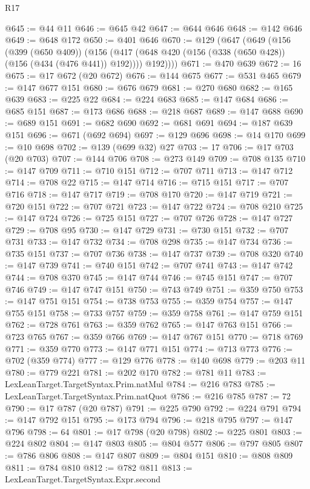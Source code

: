 \begin{lexlean}{R17}
\begin{coremodule}
@645 := @44 @11
@646 := @645 @42
@647 := @644 @646
@648 := @142 @646
@649 := @648 @172
@650 := @401 @646
@670 := @129
    (@647
      (@649
        (@156
          (@399 (@650 @409))
          (@156 (@417 (@648 @420 (@156 (@338 (@650 @428)) (@156 (@434 (@476 @441)) @192)))) @192))))
@671 := @470 @639
@672 := 16
@675 := @17 @672 (@20 @672)
@676 := @144 @675
@677 := @531 @465
@679 := @147 @677 @151
@680 := @676 @679
@681 := @270 @680
@682 := @165 @639
@683 := @225 @22
@684 := @224 @683
@685 := @147 @684
@686 := @685 @151
@687 := @173 @686
@688 := @218 @687
@689 := @147 @688
@690 := @689 @151
@691 := @682 @690
@692 := @681 @691
@694 := @187 @639 @151
@696 := @671 (@692 @694)
@697 := @129 @696
@698 := @14 @170
@699 := @10 @698
@702 := @139 (@699 @32) @27
@703 := 17
@706 := @17 @703 (@20 @703)
@707 := @144 @706
@708 := @273 @149
@709 := @708 @135
@710 := @147 @709
@711 := @710 @151
@712 := @707 @711
@713 := @147 @712
@714 := @708 @22
@715 := @147 @714
@716 := @715 @151
@717 := @707 @716
@718 := @147 @717
@719 := @708 @170
@720 := @147 @719
@721 := @720 @151
@722 := @707 @721
@723 := @147 @722
@724 := @708 @210
@725 := @147 @724
@726 := @725 @151
@727 := @707 @726
@728 := @147 @727
@729 := @708 @95
@730 := @147 @729
@731 := @730 @151
@732 := @707 @731
@733 := @147 @732
@734 := @708 @298
@735 := @147 @734
@736 := @735 @151
@737 := @707 @736
@738 := @147 @737
@739 := @708 @320
@740 := @147 @739
@741 := @740 @151
@742 := @707 @741
@743 := @147 @742
@744 := @708 @370
@745 := @147 @744
@746 := @745 @151
@747 := @707 @746
@749 := @147 @747 @151
@750 := @743 @749
@751 := @359 @750
@753 := @147 @751 @151
@754 := @738 @753
@755 := @359 @754
@757 := @147 @755 @151
@758 := @733 @757
@759 := @359 @758
@761 := @147 @759 @151
@762 := @728 @761
@763 := @359 @762
@765 := @147 @763 @151
@766 := @723 @765
@767 := @359 @766
@769 := @147 @767 @151
@770 := @718 @769
@771 := @359 @770
@773 := @147 @771 @151
@774 := @713 @773
@776 := @702 (@359 @774)
@777 := @129 @776
@778 := @140 @698
@779 := @203 @11
@780 := @779 @221
@781 := @202 @170
@782 := @781 @11
@783 := LexLeanTarget.TargetSyntax.Prim.natMul
@784 := @216 @783
@785 := LexLeanTarget.TargetSyntax.Prim.natQuot
@786 := @216 @785
@787 := 72
@790 := @17 @787 (@20 @787)
@791 := @225 @790
@792 := @224 @791
@794 := @147 @792 @151
@795 := @173 @794
@796 := @218 @795
@797 := @147 @796
@798 := 64
@801 := @17 @798 (@20 @798)
@802 := @225 @801
@803 := @224 @802
@804 := @147 @803
@805 := @804 @577
@806 := @797 @805
@807 := @786 @806
@808 := @147 @807
@809 := @804 @151
@810 := @808 @809
@811 := @784 @810
@812 := @782 @811
@813 := LexLeanTarget.TargetSyntax.Expr.second

\end{coremodule}
\end{lexlean}
